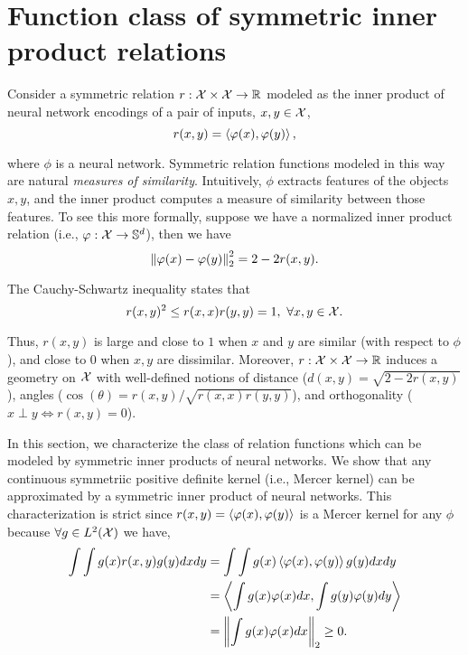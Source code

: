 \section{Function class of symmetric inner product relations}\label{sec:symmetric_relations}

Consider a symmetric relation $r: {\mathcal{X}} \times {\mathcal{X}} \to \mathbb{R}$ modeled as the inner product of neural network encodings of a pair of inputs, $x, y \in {\mathcal{X}}$,
\begin{equation}\label{eq:symmetric_iprod_relation}
    r(x, y) = \iprod{\phi(x)}{\phi(y)},
\end{equation}

\noindent where $\phi$ is a neural network. Symmetric relation functions modeled in this way are natural \textit{measures of similarity}. Intuitively, $\phi$ extracts features of the objects $x,y$, and the inner product computes a measure of similarity between those features. To see this more formally, suppose we have a normalized inner product relation (i.e., $\varphi: {\mathcal{X}} \to {\mathbb{S}}^{d}$), then we have
\begin{equation}
    \twonorm{\phi(x) - \phi(y)}^2 = 2 - 2 r(x, y).
\end{equation}

The Cauchy-Schwartz inequality states that
\begin{equation}
    r(x, y)^2 \leq r(x, x) r(y, y) = 1, \ \forall x, y \in \calX.
\end{equation}

Thus, $r(x,y)$ is large and close to $1$ when $x$ and $y$ are similar (with respect to $\phi$), and close to $0$ when $x, y$ are dissimilar. Moreover, $r: {\mathcal{X}} \times {\mathcal{X}} \to \mathbb{R}$ induces a geometry on ${\mathcal{X}}$ with well-defined notions of distance ($d(x,y) = \sqrt{2 - 2 r(x,y)}$), angles ($\cos(\theta) = r(x,y)/\sqrt{r(x,x) r(y,y)}$), and orthogonality ($x \perp y \iff r(x,y) = 0$).

In this section, we characterize the class of relation functions which can be modeled by symmetric inner products of neural networks. We show that any continuous symmetriic positive definite kernel (i.e., Mercer kernel) can be approximated by a symmetric inner product of neural networks. This characterization is strict since $r(x,y) = \left \langle \varphi(x), \varphi(y) \right\rangle$ is a Mercer kernel for any $\phi$ because $\forall g \in L^2({\mathcal{X}})$ we have,
\begin{equation*}
    \begin{split}
        \int \int g(x) r(x,y) g(y) dx dy &= \int \int g(x) \iprod{\phi(x)}{\phi(y)} g(y) dx dy \\
        &= \iprod{\int g(x) \phi(x) dx}{\int g(y) \phi(y) dy} \\
        &= \twonorm{\int g(x) \phi(x) dx} \geq 0.
    \end{split}
\end{equation*}

